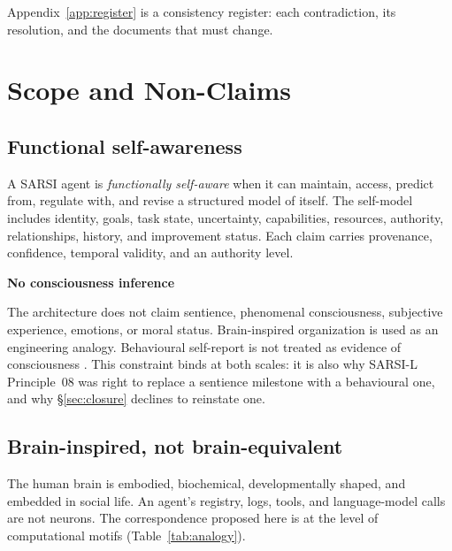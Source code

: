 \documentclass[11pt]{article}
\newenvironment{claimbox}[1]{%
  \begin{shaded}\noindent\textbf{#1}\par\smallskip}{%
  \end{shaded}}
\begin{document}
Appendix~\ref{app:register} is a consistency register: each contradiction, its resolution, and the documents that must change.

\section{Scope and Non-Claims}
\label{sec:scope}

\subsection{Functional self-awareness}
A SARSI agent is \emph{functionally self-aware} when it can maintain, access, predict from, regulate with, and revise a structured model of itself. The self-model includes identity, goals, task state, uncertainty, capabilities, resources, authority, relationships, history, and improvement status. Each claim carries provenance, confidence, temporal validity, and an authority level.

\begin{claimbox}{No consciousness inference}
The architecture does not claim sentience, phenomenal consciousness, subjective experience, emotions, or moral status. Brain-inspired organization is used as an engineering analogy. Behavioural self-report is not treated as evidence of consciousness \citep{butlin2023consciousness}. This constraint binds at both scales: it is also why SARSI-L Principle~08 was right to replace a sentience milestone with a behavioural one, and why \S\ref{sec:closure} declines to reinstate one.
\end{claimbox}

\subsection{Brain-inspired, not brain-equivalent}
The human brain is embodied, biochemical, developmentally shaped, and embedded in social life. An agent's registry, logs, tools, and language-model calls are not neurons. The correspondence proposed here is at the level of computational motifs (Table~\ref{tab:analogy}).
\end{document}
